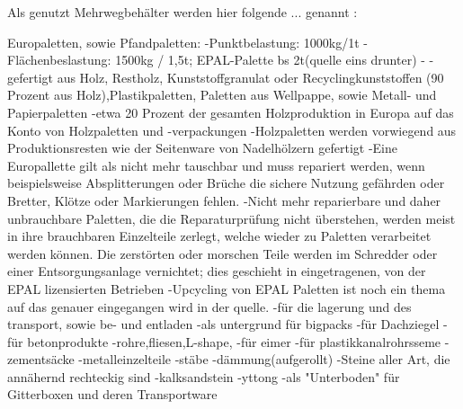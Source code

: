 Als genutzt Mehrwegbehälter werden hier folgende ... genannt :

        Europaletten, sowie Pfandpaletten:
            -Punktbelastung: 1000kg/1t
            -Flächenbeslastung: 1500kg / 1,5t; EPAL-Palette bs 2t(quelle eins drunter)
        -%
            -gefertigt aus Holz, Restholz, Kunststoffgranulat oder Recyclingkunststoffen (90 Prozent aus Holz),Plastikpaletten, Paletten aus Wellpappe, sowie Metall- und Papierpaletten
            -etwa 20 Prozent der gesamten Holzproduktion in Europa auf das Konto von Holzpaletten und -verpackungen
            -Holzpaletten werden vorwiegend aus Produktionsresten wie der Seitenware von Nadelhölzern gefertigt
            -Eine Europallette gilt als nicht mehr tauschbar und muss repariert werden, wenn beispielsweise Absplitterungen oder Brüche die sichere Nutzung gefährden oder Bretter, Klötze oder Markierungen fehlen.
            -Nicht mehr reparierbare und daher unbrauchbare Paletten, die die Reparaturprüfung nicht überstehen, werden meist in ihre brauchbaren Einzelteile zerlegt, welche wieder zu Paletten verarbeitet werden können. Die zerstörten oder morschen Teile werden im Schredder oder einer Entsorgungsanlage vernichtet; dies geschieht in eingetragenen, von der EPAL lizensierten Betrieben
            -Upcycling von EPAL Paletten ist noch ein thema auf das genauer eingegangen wird in der quelle.
            -für die lagerung und des transport, sowie be- und entladen
            -als untergrund für bigpacks
            -für Dachziegel
            -für betonprodukte
                -rohre,fliesen,L-shape, 
            -für eimer
            -für plastikkanalrohrsseme
            -zementsäcke
            -metalleinzelteile
                -stäbe
            -dämmung(aufgerollt)
            -Steine aller Art, die annähernd rechteckig sind
                -kalksandstein
                -yttong
            -als "Unterboden" für Gitterboxen und deren Transportware


